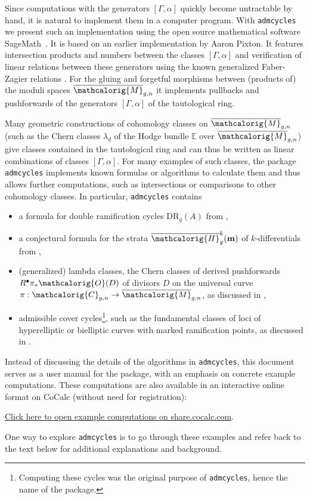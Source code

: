 \documentclass[11pt]{article}
\newcommand{\M}{\ensuremath{\overline{\mathcalorig{M}}}}
\newcommand{\DR}{\mathrm{DR}}
\newcommand{\Sage}{SageMath}
\newcommand{\cocalc}{CoCalc}
\newcommand{\admcycles}{\texttt{admcycles}}
\begin{document}
Since computations with the generators $[\Gamma, \alpha]$ quickly become untractable by hand, it is natural to implement them in a computer program. With \admcycles{} we present such an implementation using the open source mathematical software \Sage{}~\cite{sage}. It is based on an earlier implementation by Aaron Pixton. It features intersection products and numbers between the classes $[\Gamma, \alpha]$ and verification of linear relations between these generators using the known generalized Faber-Zagier relations \cite{pixtonrels,pandhapixton,jandarels}. For the gluing and forgetful morphisms between (products of) the moduli spaces $\M_{g,n}$ it implements pullbacks and pushforwards of the generators $[\Gamma, \alpha]$ of the tautological ring.

Many geometric constructions of cohomology classes on $\M_{g,n}$ (such as the Chern classes $\lambda_d$ of the Hodge bundle $\mathbb{E}$ over $\M_{g,n}$) give classes contained in the tautological ring and can thus be written as linear combinations of classes $[\Gamma, \alpha]$. For many examples of such classes, the package \admcycles{} implements known formulas or algorithms to calculate them and thus allows further computations, such as intersections or comparisons to other cohomology classes. In particular, \admcycles{} contains
\begin{itemize}
    \item a formula for double ramification cycles $\DR_g(A)$ from \cite{Janda2016Double-ramifica} ,
    \item a conjectural formula for the strata $\overline{\mathcalorig{H}}_g^k(\textbf{m})$ of $k$-differentials from \cite{FP,SchmittDimension},
    \item (generalized) lambda classes, the Chern classes of derived pushforwards $R^\bullet \pi_* \mathcalorig{O}(D)$ of divisors $D$ on the universal curve $\pi: \mathcalorig{C}_{g,n} \to \M_{g,n}$, as discussed in \cite{PRvZ},
    \item admissible cover cycles\footnote{Computing these cycles was the original purpose of \texttt{admcycles}, hence the name of the package.}, such as the fundamental classes of loci of hyperelliptic or bielliptic curves with marked ramification points, as discussed in \cite{schmittvanzelm}.
\end{itemize}
Instead of discussing the details of the algorithms in \admcycles{}, this document serves as a user manual for the package, with an emphasis on concrete example computations. These computations are also available in an interactive online format on \cocalc{} (without need for registration):
\begin{center}
\href{https://share.cocalc.com/share/0a48957b67f375b9e3107216504ca0c4efb678fd/admcycles%20tutorial.ipynb?viewer=share}{Click here to open example computations on share.cocalc.com}.
\end{center}
One way to explore \admcycles{} is to go through these examples and refer back to the text below for additional explanations and background.
\end{document}
